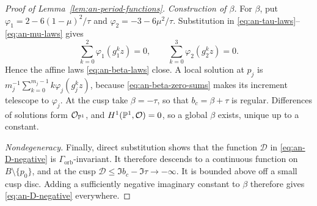 \begin{proof}[Proof of Lemma~\ref{lem:an-period-functions}]
\smallskip
\noindent\emph{Construction of $\beta$.}
For $\beta$, put $\varphi_1=2-6(1-\mu)^2/\tau$ and
$\varphi_2=-3-6\mu^2/\tau$.
Substitution in \eqref{eq:an-tau-laws}--\eqref{eq:an-mu-laws} gives
\begin{equation}\label{eq:an-beta-zero-sums}
 \sum_{k=0}^{2}\varphi_1(g_1^kz)=0,
 \qquad
 \sum_{k=0}^{3}\varphi_2(g_2^kz)=0.
\end{equation}
Hence the affine laws \eqref{eq:an-beta-laws} close.  A local solution at
$p_j$ is $m_j^{-1}\sum_{k=0}^{m_j-1}k\varphi_j(g_j^kz)$,
because \eqref{eq:an-beta-zero-sums} makes its increment telescope to
$\varphi_j$.  At the cusp take $\beta=-\tau$, so that
$b_c=\beta+\tau$ is regular.  Differences of solutions form
$\mathcal O_{\mathbb P^1}$, and $H^1(\mathbb P^1,\mathcal O)=0$, so a global $\beta$ exists,
unique up to a constant.

\smallskip
\noindent\emph{Nondegeneracy.}
Finally, direct substitution shows that the function $\mathcal D$ in
\eqref{eq:an-D-negative} is
$\Gamma_{\mathrm{orb}}$-invariant.  It therefore descends to a continuous
function on $B\setminus\{p_0\}$, and at the cusp
$\mathcal D\leq \Im b_c-\Im\tau\to-\infty$.
It is bounded above off a small cusp disc.  Adding a sufficiently negative
imaginary constant to $\beta$ therefore gives
\eqref{eq:an-D-negative} everywhere.
\end{proof}
